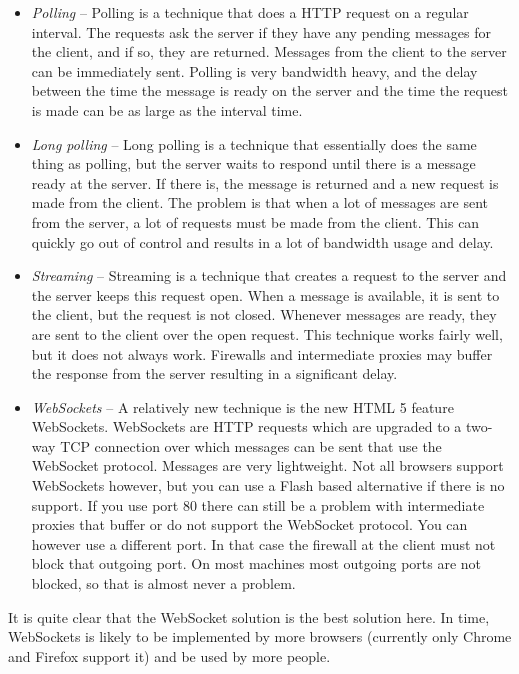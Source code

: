 \documentclass[11pt]{article}
\begin{document}
\begin{itemize}
\item \textit{Polling} -- Polling is a technique that does a HTTP request on a regular interval.
The requests ask the server if they have any pending messages for the client, and if so, they are returned. Messages from the client to the server can be immediately sent.
Polling is very bandwidth heavy, and the delay between the time the message is ready on the server and the time the request is made can be as large as the interval time.
\item \textit{Long polling} -- Long polling is a technique that essentially does the same thing as polling, but the server waits to respond until there is a message ready at the server.
If there is, the message is returned and a new request is made from the client.
The problem is that when a lot of messages are sent from the server, a lot of requests must be made from the client.
This can quickly go out of control and results in a lot of bandwidth usage and delay.
\item \textit{Streaming} -- Streaming is a technique that creates a request to the server and the server keeps this request open.
When a message is available, it is sent to the client, but the request is not closed.
Whenever messages are ready, they are sent to the client over the open request.
This technique works fairly well, but it does not always work.
Firewalls and intermediate proxies may buffer the response from the server resulting in a significant delay.
\item \textit{WebSockets} -- A relatively new technique is the new HTML 5 feature WebSockets.
WebSockets are HTTP requests which are upgraded to a two-way TCP connection over which messages can be sent that use the WebSocket protocol.
Messages are very lightweight.
Not all browsers support WebSockets however, but you can use a Flash based alternative if there is no support.
If you use port 80 there can still be a problem with intermediate proxies that buffer or do not support the WebSocket protocol.
You can however use a different port.
In that case the firewall at the client must not block that outgoing port.
On most machines most outgoing ports are not blocked, so that is almost never a problem.
\end{itemize}

It is quite clear that the WebSocket solution is the best solution here.
In time, WebSockets is likely to be implemented by more browsers (currently only Chrome and Firefox support it) and be used by more people.
\end{document}
